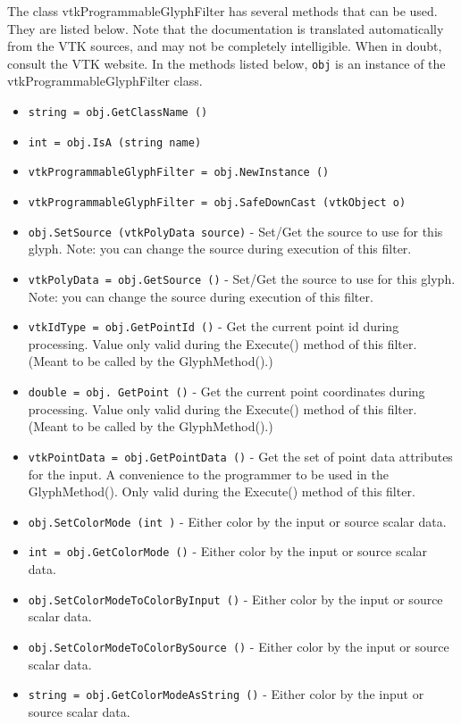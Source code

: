 The class vtkProgrammableGlyphFilter has several methods that can be used.
  They are listed below.
Note that the documentation is translated automatically from the VTK sources,
and may not be completely intelligible.  When in doubt, consult the VTK website.
In the methods listed below, \verb|obj| is an instance of the vtkProgrammableGlyphFilter class.
\begin{itemize}
\item  \verb|string = obj.GetClassName ()|

\item  \verb|int = obj.IsA (string name)|

\item  \verb|vtkProgrammableGlyphFilter = obj.NewInstance ()|

\item  \verb|vtkProgrammableGlyphFilter = obj.SafeDownCast (vtkObject o)|

\item  \verb|obj.SetSource (vtkPolyData source)| -  Set/Get the source to use for this glyph. 
 Note: you can change the source during execution of this filter.

\item  \verb|vtkPolyData = obj.GetSource ()| -  Set/Get the source to use for this glyph. 
 Note: you can change the source during execution of this filter.

\item  \verb|vtkIdType = obj.GetPointId ()| -  Get the current point id during processing. Value only valid during the
 Execute() method of this filter. (Meant to be called by the GlyphMethod().)

\item  \verb|double = obj. GetPoint ()| -  Get the current point coordinates during processing. Value only valid during the
 Execute() method of this filter. (Meant to be called by the GlyphMethod().)

\item  \verb|vtkPointData = obj.GetPointData ()| -  Get the set of point data attributes for the input. A convenience to the
 programmer to be used in the GlyphMethod(). Only valid during the Execute()
 method of this filter.

\item  \verb|obj.SetColorMode (int )| -  Either color by the input or source scalar data.

\item  \verb|int = obj.GetColorMode ()| -  Either color by the input or source scalar data.

\item  \verb|obj.SetColorModeToColorByInput ()| -  Either color by the input or source scalar data.

\item  \verb|obj.SetColorModeToColorBySource ()| -  Either color by the input or source scalar data.

\item  \verb|string = obj.GetColorModeAsString ()| -  Either color by the input or source scalar data.

\end{itemize}
